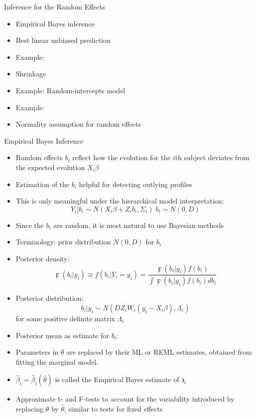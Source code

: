 \documentclass{beamer}
\begin{document}
\begin{frame}{Inference for the Random Effects}
\begin{itemize}
	\item Empirical Bayes inference
	\item Best linear unbiased prediction
	\item Example: 
	\item Shrinkage
	\item Example: Random-intercepts model
	\item Example:
	\item Normality assumption for random effects
\end{itemize}
\end{frame}

\begin{frame}{Empirical Bayes Inference}
\begin{itemize}
	\item Random effects $b_i$ reflect how the evolution for the $i$th subject deviates from the expected evolution $X_i\beta$
	\item Estimation of the $b_i$ helpful for detecting outlying profiles
	\item This is only meaningful under the hierarchical model interpretation:
	\[Y_i|b_i\sim N(X_i\beta+Z_ib_i,\Sigma_i) \; b_i\sim N(0,D)\]
	\item Since the $b_i$ are random, it is most natural to use Bayesian methods
	\item Terminology: prior distribution $N(0,D)$ for $b_i$
\end{itemize}
\end{frame}

\begin{frame}
\begin{itemize}
	\item Posterior density:
	\[\digamma (b_i|y_i)\equiv f(b_i|Y_i= y_i)=\frac{\digamma(b_i|y_i)f(b_i)}{\int \digamma(b_i|y_i)f(b_i)db_i}
	\]
	\item Posterior distribution:
	\[b_i|y_i\sim N(DZ_iW_i(y_i-X_i\beta),\Lambda_i)
	\] for some positive definite matrix $\Lambda_i$
	\item Posterior mean as estimate for $b_i$:
	\item Parameters in $\theta$ are replaced by their ML or REML estimates, obtained from fitting the marginal model.
	\item $\hat{\beta}_i=\hat{\beta}_i(\hat{\theta})$ is called the {\color{blue} Empirical Bayes} estimate of $\backepsilon_i$
	\item Approximate t- and F-tests to account for the variability introduced by replacing $\theta$ by $\hat{\theta}$, similar to tests for fixed effects
\end{itemize}
\end{frame}
\end{document}

